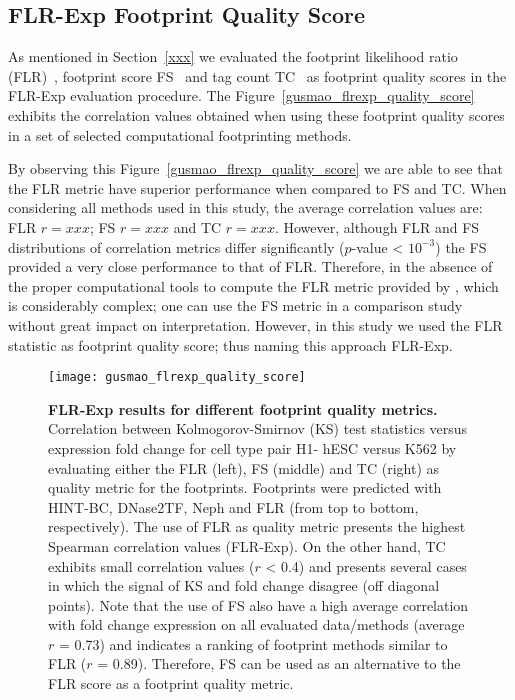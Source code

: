 
\subsection{FLR-Exp Footprint Quality Score}
\label{sec:flrexp.footprint.quality.score}

As mentioned in Section~\ref{xxx} we evaluated the footprint likelihood ratio (FLR)~\cite{xxx}, footprint score FS~\cite{xxxx} and tag count TC~\cite{xxxx} as footprint quality scores in the FLR-Exp evaluation procedure. The Figure~\ref{gusmao_flrexp_quality_score} exhibits the correlation values obtained when using these footprint quality scores in a set of selected computational footprinting methods.

By observing this Figure~\ref{gusmao_flrexp_quality_score} we are able to see that the FLR metric have superior performance when compared to FS and TC. When considering all methods used in this study, the average correlation values are: FLR $r = xxx$; FS $r = xxx$ and TC $r = xxx$. However, although FLR and FS distributions of correlation metrics differ significantly ($p$-value < $10^{-3}$) the FS provided a very close performance to that of FLR. Therefore, in the absence of the proper computational tools to compute the FLR metric provided by , which is considerably complex; one can use the FS metric in a comparison study without great impact on interpretation. However, in this study we used the FLR statistic as footprint quality score; thus naming this approach FLR-Exp.

\begin{figure}[h!]
\centering
\texttt{[image: gusmao\_flrexp\_quality\_score]}
\caption[FLR-Exp results for different footprint quality metrics]{\textbf{FLR-Exp results for different footprint quality metrics.} Correlation between Kolmogorov-Smirnov (KS) test statistics versus expression fold change for cell type pair H1- hESC versus K562 by evaluating either the FLR (left), FS (middle) and TC (right) as quality metric for the footprints. Footprints were predicted with HINT-BC, DNase2TF, Neph and FLR (from top to bottom, respectively). The use of FLR as quality metric presents the highest Spearman correlation values (FLR-Exp). On the other hand, TC exhibits small correlation values ($r$ < 0.4) and presents several cases in which the signal of KS and fold change disagree (off diagonal points). Note that the use of FS also have a high average correlation with fold change expression on all evaluated data/methods (average $r$ = 0.73) and indicates a ranking of footprint methods similar to FLR ($r$ = 0.89). Therefore, FS can be used as an alternative to the FLR score as a footprint quality metric.}
\label{fig:gusmao_flrexp_quality_score}
\end{figure}

